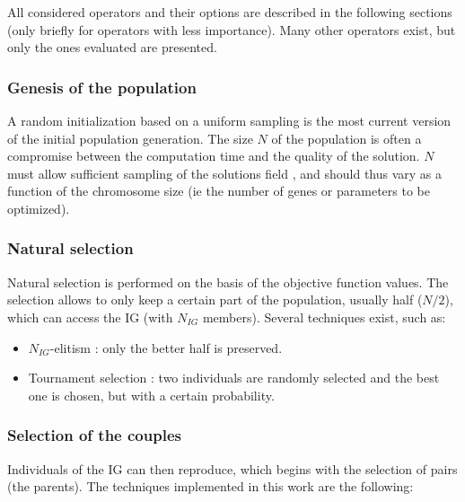 \documentclass{ametsoc}
\begin{document}
All considered operators and their options are described in the following sections (only briefly for operators with less importance). Many other operators exist, but only the ones evaluated are presented.

\subsubsection{Genesis of the population}

A random initialization based on a uniform sampling is the most current version of the initial population generation. The size $N$ of the population is often a compromise between the computation time and the quality of the solution. $N$ must allow sufficient sampling of the solutions field \citep{Beasley1996a}, and should thus vary as a function of the chromosome size (ie the number of genes or parameters to be optimized). 


\subsubsection{Natural selection}
\label{sec:gas:nat_selection}

Natural selection is performed on the basis of the objective function values. The selection allows to only keep a certain part of the population, usually half ($N/2$), which can access the IG (with $N_{IG}$ members). Several techniques exist, such as:

\begin{itemize}
	\item $N_{IG}$-elitism \citep{Michalewicz1996}: only the better half is preserved. 
	
	\item Tournament selection \citep{Michalewicz1996, Zitzler2004a}: two individuals are randomly selected and the best one is chosen, but with a certain probability.
\end{itemize}


\subsubsection{Selection of the couples}
\label{sec:gas:selection_couples}

Individuals of the IG can then reproduce, which begins with the selection of pairs (the parents). The techniques implemented in this work are the following:
\end{document}
